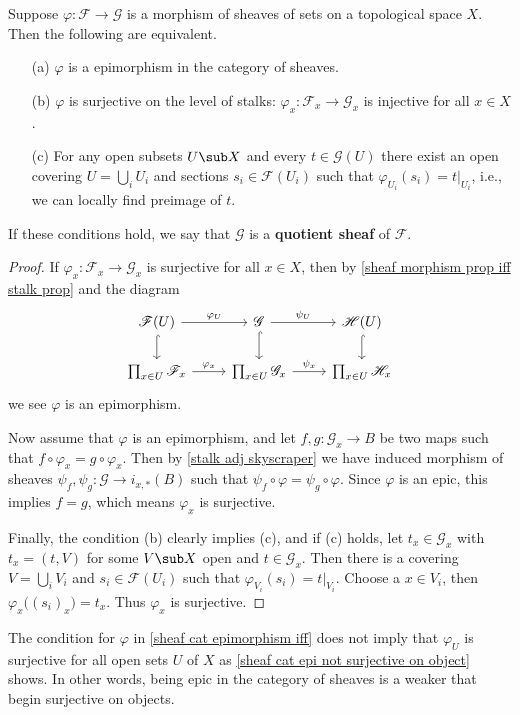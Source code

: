 \begin{proposition}\label{sheaf cat epimorphism iff}
Suppose $\varphi:\mathscr{F}\to\mathscr{G}$ is a morphism of sheaves of sets on a topological space $X$. Then the following are equivalent.
\begin{itemize}
\item[(a)] $\varphi$ is a epimorphism in the category of sheaves.
\item[(b)] $\varphi$ is surjective on the level of stalks: $\varphi_x:\mathscr{F}_x\to\mathscr{G}_x$ is injective for all $x\in X$.
\item[(c)] For any open subsets $U\sub X$ and every $t\in\mathscr{G}(U)$ there exist an open covering $U=\bigcup_iU_i$ and sections $s_i\in\mathscr{F}(U_i)$ such that $\varphi_{U_i}(s_i)=t|_{U_i}$, i.e., we can locally find preimage of $t$.
\end{itemize}
If these conditions hold, we say that $\mathscr{G}$ is a \textbf{quotient sheaf} of $\mathscr{F}$.
\end{proposition}
\begin{proof}
If $\varphi_x:\mathscr{F}_x\to\mathscr{G}_x$ is surjective for all $x\in X$, then by \cref{sheaf morphism prop iff stalk prop} and the diagram
\[\begin{tikzcd}
\mathscr{F}(U)\ar[r,"\varphi_U"]\ar[d,hook]&\mathscr{G}\ar[r,"\psi_U"]\ar[d,hook]&\mathscr{H}(U)\ar[d,hook]\\
\prod_{x\in U}\mathscr{F}_x\ar[r,"\varphi_x"]&\prod_{x\in U}\mathscr{G}_x\ar[r,"\psi_x"]&\prod_{x\in U}\mathscr{H}_x
\end{tikzcd}\]
we see $\varphi$ is an epimorphism.\par
Now assume that $\varphi$ is an epimorphism, and let $f,g:\mathscr{G}_x\to B$ be two maps such that $f\circ\varphi_x=g\circ\varphi_x$. Then by \cref{stalk adj skyscraper} we have induced morphism of sheaves $\psi_f,\psi_g:\mathscr{G}\to i_{x,*}(B)$ such that $\psi_f\circ\varphi=\psi_g\circ\varphi$. Since $\varphi$ is an epic, this implies $f=g$, which means $\varphi_x$ is surjective.\par
Finally, the condition (b) clearly implies (c), and if (c) holds, let $t_x\in\mathscr{G}_x$ with $t_x=(t,V)$ for some $V\sub X$ open and $t\in\mathscr{G}_x$. Then there is a covering $V=\bigcup_iV_i$ and $s_i\in\mathscr{F}(U_i)$ such that $\varphi_{V_i}(s_i)=t|_{V_i}$. Choose a $x\in V_i$, then $\varphi_x\big((s_i)_x\big)=t_x$. Thus $\varphi_x$ is surjective.
\end{proof}
\begin{remark}
The condition for $\varphi$ in \cref{sheaf cat epimorphism iff} does not imply that $\varphi_U$ is surjective for all open sets $U$ of $X$ as \cref{sheaf cat epi not surjective on object} shows. In other words, being epic in the category of sheaves is a weaker that begin surjective on objects.
\end{remark}
